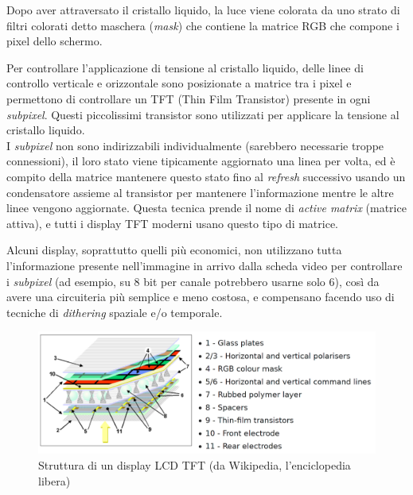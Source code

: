 Dopo aver attraversato il cristallo liquido, la luce viene colorata da uno strato di filtri colorati detto maschera (\textit{mask}) che contiene la matrice RGB che compone i pixel dello schermo.

Per controllare l'applicazione di tensione al cristallo liquido, delle linee di controllo verticale e orizzontale sono posizionate a matrice tra i pixel e permettono di controllare un TFT (Thin Film Transistor) presente in ogni \textit{subpixel}. Questi piccolissimi transistor sono utilizzati per applicare la tensione al cristallo liquido\cite{lcdevolution}.\\
I \textit{subpixel} non sono indirizzabili individualmente (sarebbero necessarie troppe connessioni), il loro stato viene tipicamente aggiornato una linea per volta, ed è compito della matrice mantenere questo stato fino al \textit{refresh} successivo usando un condensatore assieme al transistor per mantenere l'informazione mentre le altre linee vengono aggiornate. Questa tecnica prende il nome di \textit{active matrix}\cite{lcdevolution} (matrice attiva), e tutti i display TFT moderni usano questo tipo di matrice.

Alcuni display, soprattutto quelli più economici, non utilizzano tutta l'informazione presente nell'immagine in arrivo dalla scheda video per controllare i \textit{subpixel} (ad esempio, su 8 bit per canale potrebbero usarne solo 6), così da avere una circuiteria più semplice e meno costosa, e compensano facendo uso di tecniche di \textit{dithering} spaziale e/o temporale.

\begin{figure}[h]
	\centering
	\includegraphics[width=\textwidth]{Introduzione_files/lcdtft.png}
	\caption{Struttura di un display LCD TFT (da Wikipedia, l'enciclopedia libera)}
	\label{fig:lcdtft}
\end{figure}

